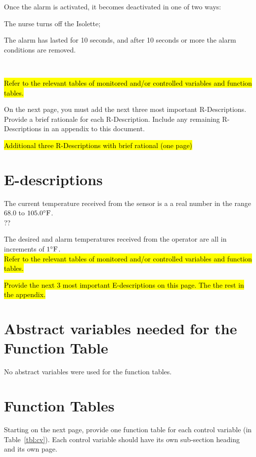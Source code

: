 \documentclass[fontsize=12pt,paper=letter,twoside]{scrartcl}
\begin{document}
\rdescription
{Once the alarm is activated, it becomes deactivated in one of two ways:
\begin{mylist}
\item The nurse turns off the Isolette;
\item The alarm has lasted for 10 seconds, and after 10 seconds or more the alarm conditions are removed.
\end{mylist}~\\}
{\hl{Refer to the relevant tables of monitored and/or controlled variables and function tables.}}
\label{R4}


On the next page, you must add the next three most important R-Descriptions. Provide a brief rationale for each R-Description. Include any remaining R-Descriptions in an appendix to this document. 

\newpage
\hl{Additional three R-Descriptions with brief rational (one page)}

\newpage
\section{E-descriptions}
\edescription
{The current temperature received from the sensor is a a real number in the range $68.0$ to $105.0 ^{\circ}\mathrm{F}$.\\}
{??}
\label{E1}

{The desired and alarm temperatures received from the operator are all in increments of $1 ^{\circ}\mathrm{F}$.\\}
{\hl{Refer to the relevant tables of monitored and/or controlled variables and function tables.}}
\label{E2}

\hl{Provide the next 3 most important E-descriptions on this page. The the rest in the appendix.}
\newpage
\section{Abstract variables needed for the Function Table}

No abstract variables were used for the function tables.


\section{Function Tables}

Starting on the next page, provide one function table for each control variable (in Table~\ref{tbl:cv}). Each control variable should have its own sub-section heading and its own page.
\end{document}
